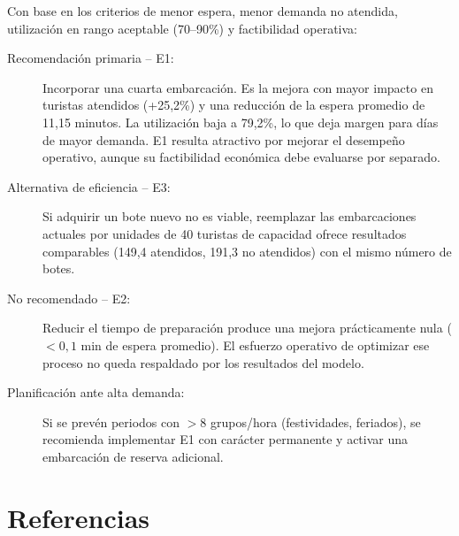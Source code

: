\documentclass[12pt,a4paper]{article}
\begin{document}
Con base en los criterios de menor espera, menor demanda no atendida,
utilización en rango aceptable (70--90\%) y factibilidad operativa:

\begin{description}
  \item[Recomendación primaria -- E1:] Incorporar una cuarta embarcación.
    Es la mejora con mayor impacto en turistas atendidos (+25,2\%) y una
    reducción de la espera promedio de 11,15 minutos. La utilización baja a 79,2\%,
    lo que deja margen para días de mayor demanda. E1 resulta atractivo por
    mejorar el desempeño operativo, aunque su factibilidad económica debe
    evaluarse por separado.

  \item[Alternativa de eficiencia -- E3:] Si adquirir un bote nuevo no es
    viable, reemplazar las embarcaciones actuales por unidades de 40
    turistas de capacidad ofrece resultados comparables (149,4 atendidos,
    191,3 no atendidos) con el mismo número de botes.

  \item[No recomendado -- E2:] Reducir el tiempo de preparación produce
    una mejora prácticamente nula ($<0{,}1$ min de espera promedio). El
    esfuerzo operativo de optimizar ese proceso no queda respaldado por
    los resultados del modelo.

  \item[Planificación ante alta demanda:] Si se prevén periodos con $>8$
    grupos/hora (festividades, feriados), se recomienda implementar E1
    con carácter permanente y activar una embarcación de reserva adicional.
\end{description}

\section{Referencias}
\end{document}
